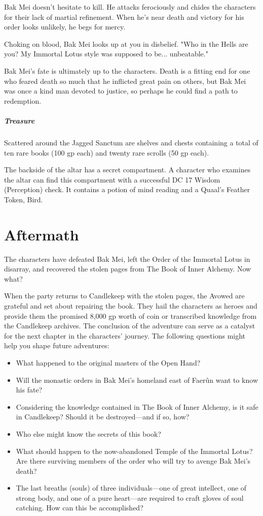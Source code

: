 \documentclass[10pt,a4paper,twoside,bg=print,twocolumn,openany,nodeprecatedcode]{dndbook}
\begin{document}
Bak Mei doesn't hesitate to kill. He attacks ferociously and chides the characters for their lack of martial refinement. When he's near death and victory for his order looks unlikely, he begs for mercy.

\begin{DndReadAloud}{}
Choking on blood, Bak Mei looks up at you in disbelief. "Who in the Hells are you? My Immortal Lotus style was supposed to be... unbeatable."

\end{DndReadAloud}

Bak Mei's fate is ultimately up to the characters. Death is a fitting end for one who feared death so much that he inflicted great pain on others, but Bak Mei was once a kind man devoted to justice, so perhaps he could find a path to redemption.

\subparagraph{Treasure}
Scattered around the Jagged Sanctum are shelves and chests containing a total of ten rare books (100 gp each) and twenty rare scrolls (50 gp each).

The backside of the altar has a secret compartment. A character who examines the altar can find this compartment with a successful DC 17 Wisdom (Perception) check. It contains a potion of mind reading and a Quaal's Feather Token, Bird.

\section{Aftermath}
The characters have defeated Bak Mei, left the Order of the Immortal Lotus in disarray, and recovered the stolen pages from The Book of Inner Alchemy. Now what?

When the party returns to Candlekeep with the stolen pages, the Avowed are grateful and set about repairing the book. They hail the characters as heroes and provide them the promised 8,000 gp worth of coin or transcribed knowledge from the Candlekeep archives. The conclusion of the adventure can serve as a catalyst for the next chapter in the characters' journey. The following questions might help you shape future adventures:


\begin{itemize}
\item What happened to the original masters of the Open Hand?
\item Will the monastic orders in Bak Mei's homeland east of Faerûn want to know his fate?
\item Considering the knowledge contained in The Book of Inner Alchemy, is it safe in Candlekeep? Should it be destroyed—and if so, how?
\item Who else might know the secrets of this book?
\item What should happen to the now-abandoned Temple of the Immortal Lotus? Are there surviving members of the order who will try to avenge Bak Mei's death?
\item The last breaths (souls) of three individuals—one of great intellect, one of strong body, and one of a pure heart—are required to craft gloves of soul catching. How can this be accomplished?
\end{itemize}
\end{document}
